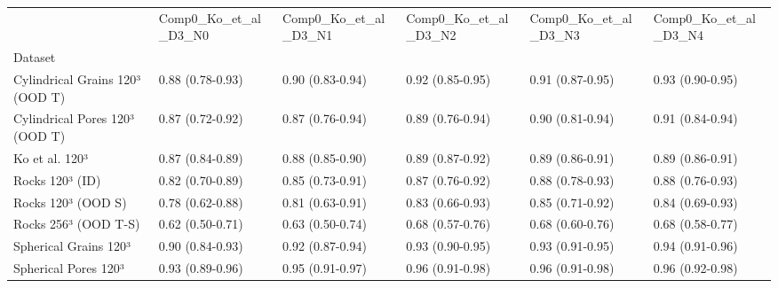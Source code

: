 \begin{tabular}{llllll}
\toprule
 & Comp0_Ko_et_al_D3_N0 & Comp0_Ko_et_al_D3_N1 & Comp0_Ko_et_al_D3_N2 & Comp0_Ko_et_al_D3_N3 & Comp0_Ko_et_al_D3_N4 \\
Dataset &  &  &  &  &  \\
\midrule
Cylindrical Grains 120³ (OOD T) & 0.88 (0.78-0.93) & 0.90 (0.83-0.94) & 0.92 (0.85-0.95) & 0.91 (0.87-0.95) & 0.93 (0.90-0.95) \\
Cylindrical Pores 120³ (OOD T) & 0.87 (0.72-0.92) & 0.87 (0.76-0.94) & 0.89 (0.76-0.94) & 0.90 (0.81-0.94) & 0.91 (0.84-0.94) \\
Ko et al. 120³ & 0.87 (0.84-0.89) & 0.88 (0.85-0.90) & 0.89 (0.87-0.92) & 0.89 (0.86-0.91) & 0.89 (0.86-0.91) \\
Rocks 120³ (ID) & 0.82 (0.70-0.89) & 0.85 (0.73-0.91) & 0.87 (0.76-0.92) & 0.88 (0.78-0.93) & 0.88 (0.76-0.93) \\
Rocks 120³ (OOD S) & 0.78 (0.62-0.88) & 0.81 (0.63-0.91) & 0.83 (0.66-0.93) & 0.85 (0.71-0.92) & 0.84 (0.69-0.93) \\
Rocks 256³ (OOD T-S) & 0.62 (0.50-0.71) & 0.63 (0.50-0.74) & 0.68 (0.57-0.76) & 0.68 (0.60-0.76) & 0.68 (0.58-0.77) \\
Spherical Grains 120³ & 0.90 (0.84-0.93) & 0.92 (0.87-0.94) & 0.93 (0.90-0.95) & 0.93 (0.91-0.95) & 0.94 (0.91-0.96) \\
Spherical Pores 120³ & 0.93 (0.89-0.96) & 0.95 (0.91-0.97) & 0.96 (0.91-0.98) & 0.96 (0.91-0.98) & 0.96 (0.92-0.98) \\
\bottomrule
\end{tabular}
